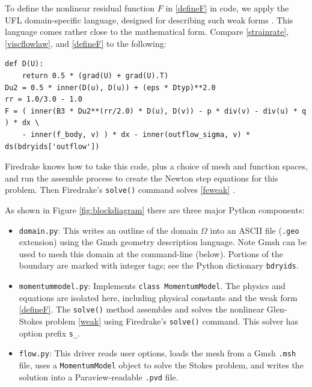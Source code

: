 \documentclass[letterpaper,final,12pt,reqno]{amsart}
\begin{document}
To define the nonlinear residual function $F$ in \eqref{defineF} in code, we apply the UFL domain-specific language, designed for describing such weak forms \cite{Alnaesetal2014}.  This language comes rather close to the mathematical form.  Compare \eqref{strainrate}, \eqref{viscflowlaw}, and \eqref{defineF} to the following:
\begin{Verbatim}[fontsize=\small,frame=lines]
def D(U):
    return 0.5 * (grad(U) + grad(U).T)
Du2 = 0.5 * inner(D(u), D(u)) + (eps * Dtyp)**2.0
rr = 1.0/3.0 - 1.0
F = ( inner(B3 * Du2**(rr/2.0) * D(u), D(v)) - p * div(v) - div(u) * q ) * dx \
    - inner(f_body, v) ) * dx - inner(outflow_sigma, v) * ds(bdryids['outflow'])
\end{Verbatim}

Firedrake knows how to take this code, plus a choice of mesh and function spaces, and run the assemble process to create the Newton step equations for this problem.  Then Firedrake's \texttt{solve()} command solves \eqref{feweak} \cite{Rathgeberetal2016}.

\medskip
As shown in Figure \ref{fig:blockdiagram} there are three major Python components:
\begin{itemize}
\item \texttt{domain.py}: \quad  This writes an outline of the domain $\Omega$ into an ASCII file (\texttt{.geo} extension) using the Gmsh \cite{GeuzaineRemacle2009} geometry description language.  Note Gmsh can be used to mesh this domain at the command-line (below).  Portions of the boundary are marked with integer tags; see the Python dictionary \texttt{bdryids}.

\item \texttt{momentummodel.py}: \quad  Implements \texttt{class MomentumModel}.  The physics and equations are isolated here, including physical constants and the weak form \eqref{defineF}.  The \texttt{solve()} method assembles and solves the nonlinear Glen-Stokes problem \eqref{weak} using Firedrake's \texttt{solve()} command.  This solver has option prefix \texttt{s\_}.

\item \texttt{flow.py}: \quad  This driver reads user options, loads the mesh from a Gmsh \texttt{.msh} file, uses a \texttt{MomentumModel} object to solve the Stokes problem, and writes the solution into a Paraview-readable \texttt{.pvd} file.
\end{itemize}
\end{document}
